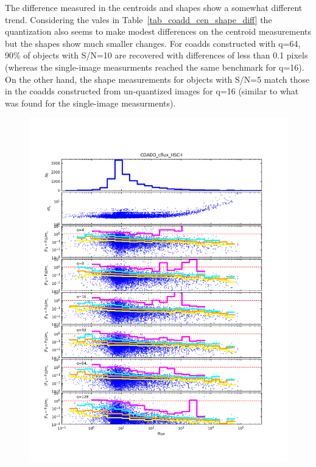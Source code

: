The difference measured in the centroids and shapes show a somewhat different trend.  Considering the 
vales in Table~\ref{tab_coadd_cen_shape_diff} the quantization also seems to make modest differences on 
the centroid measurements but the shapes show much smaller changes.  For coadds constructed with q=64, 90\% 
of objects with S/N=10 are recovered with differences of less than 0.1 pixels (whereas the single-image
measurments reached the same benchmark for q=16).  On the other hand, the shape measurements for objects with
S/N=5 match those in the coadds constructed from un-quantized images for q=16 (similar to what was found 
for the single-image measurments).

\begin{figure}[t]
\centering
    \begin{minipage}{.49\textwidth}
        \centering
        \includegraphics[width=1.0\textwidth]{figure/plot_coadd_cflux_HSC-I.png}
    \end{minipage}

\end{figure}
